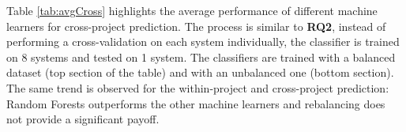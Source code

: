 \begin{table}[t]
	\caption{Average performance of different machine learners for cross-project prediction.}
	\label{tab:avgCross}
	\centering
	\vspace{-3mm}
\end{table}

Table \ref{tab:avgCross} highlights the average performance of different machine learners for cross-project prediction. The process is similar to \textbf{RQ2}, instead of performing a cross-validation on each system individually, the classifier is trained on 8 systems and tested on 1 system. The classifiers are trained with a balanced dataset (top section of the table) and with an unbalanced one (bottom section). The same trend is observed for the within-project and cross-project prediction: Random Forests outperforms the other machine learners and rebalancing does not provide a significant payoff. 

